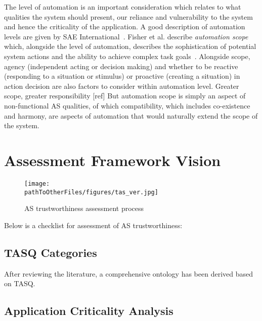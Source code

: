 The level of automation is an important consideration which relates to what qualities the system should present, our reliance and vulnerability to the system and hence the criticality of the application. A good description of automation levels are given by SAE International~\cite{SAEJ3016}. 
%
Fisher et al. describe \emph{automation scope} which, alongside the level of automation, describes the sophistication of potential system actions and the ability to achieve complex task goals~\cite{Fisher2021}. 
%
Alongside scope, agency (independent acting or decision making) and whether to be reactive (responding to a situation or stimulus) or proactive (creating a situation) in action decision are also factors to consider within automation level.
%
Greater scope, greater responsibility [ref]
%
%
But automation scope is simply an aspect of non-functional AS qualities, of which compatibility, which includes co-existence and harmony, are aspects of automation that would naturally extend the scope of the system. 





\section{Assessment Framework Vision} \label{sec:AssFramVis}

\begin{figure*}[]
    \centering
    \texttt{[image: \\pathToOtherFiles/figures/tas\_ver.jpg]}
    \caption{AS trustworthiness assessment process}
    \label{fig:tas_ver}
\end{figure*}

Below is a checklist for assessment of AS trustworthiness:

\subsection{TASQ Categories}

After reviewing the literature, a comprehensive ontology has been derived based on TASQ. 

\subsection{Application Criticality Analysis}


